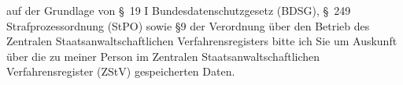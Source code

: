 auf der Grundlage von §~19 I Bundesdatenschutzgesetz (BDSG),
§~249 Strafprozessordnung (StPO) sowie §9 der Verordnung über den
Betrieb des Zentralen Staatsanwaltschaftlichen Verfahrensregisters bitte ich Sie
um Auskunft über die zu meiner Person im Zentralen Staatsanwaltschaftlichen
Verfahrensregister (ZStV) gespeicherten Daten.